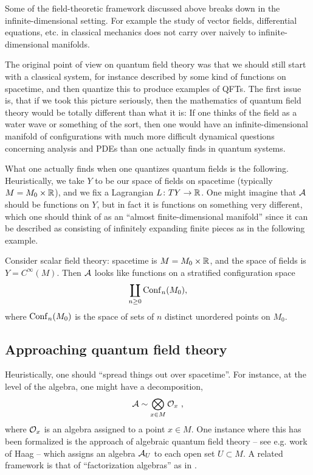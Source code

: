 Some of the field-theoretic framework discussed above breaks down in the
infinite-dimensional setting. 
For example the study of vector fields, differential
equations, etc. in classical mechanics does not carry over naively to infinite-dimensional
manifolds.

The original point of view on quantum field theory was that we should still start with a
classical system, for instance described by some kind of functions on spacetime, and then
quantize this to produce examples of QFTs.
The first issue is, that if we took this picture seriously, then the mathematics of
quantum field theory would be totally  different than what it is:
If one thinks of the field as a water wave or something of the sort, then one would have
an infinite-dimensional manifold of configurations with much more difficult dynamical
questions concerning analysis and PDEs than one actually finds in quantum systems. 

What one actually finds when one quantizes quantum fields is the following. 
Heuristically, we take $Y$ to be our space of fields on spacetime (typically $M = M_0
\times \mathbb{R}$), and we fix a Lagrangian $L\colon T Y \to \mathbb{R}$.
One might imagine that $\mathcal{A}$ should be functions on $Y$, but in fact it is functions on
something very different, which one should think of as an  ``almost finite-dimensional
manifold''  since it can be described as consisting of infinitely expanding finite pieces
as in the following example.

\begin{ex}
Consider scalar field theory: spacetime is $M = M_0 \times \mathbb{R}$, and the space of fields is
$Y = C^\infty\left(M\right)$. 
Then $\mathcal{A}$ looks like functions on a stratified configuration space
\begin{equation*}
\coprod_{n \geq 0} \mathrm{Conf}_n(M_0),
\end{equation*}
where $\mathrm{Conf}_n(M_0)$ is the space of sets of $n$ distinct unordered points on $M_0$.
\end{ex}


\subsection{Approaching quantum field theory}

Heuristically, one should ``spread things out over spacetime''. 
For instance, at the level of the algebra, one might have a decomposition,
\begin{equation*}
	\Ac \sim \bigotimes_{x \in M} \Oc_x \ ,
\end{equation*}
where $\mathcal{O}_x$ is an algebra assigned to a point $x\in M$.
One instance where this has been formalized is the
approach of algebraic quantum field theory -- see e.g. work of Haag \cite{HK} -- which
assigns an algebra $\mathcal{A}_U$ to each open set $U \subset M$. 
A related framework is that of ``factorization algebras'' as in 
\cite{CG1,CG2}.

